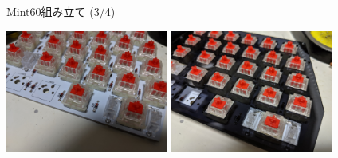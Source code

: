 \documentclass[cjk,dvipdfmx,10pt,compress,fragile%
hyperref={bookmarks=true,bookmarksnumbered=true,bookmarksopen=false,%
colorlinks=false,%
pdftitle={第 134 回 関西 Debian 勉強会},%
pdfauthor={小林},%
pdfsubject={資料},%
}]{beamer}
\begin{document}
\begin{frame}[fragile,t]{Mint60組み立て (3/4)}
 \begin{itemize}
 \end{itemize}
 \vspace*{-1zw}
 \begin{center}
  \includegraphics[keepaspectratio,height=4cm]{./img/mint60-build-03.jpg} \hspace*{1zw}
  \includegraphics[keepaspectratio,height=4cm]{./img/mint60-build-04.jpg}
 \end{center}
 \vspace*{-1zw}
 \begin{itemize}
		    \begin{itemize}
		    \end{itemize}
 \end{itemize}
\end{frame}
\end{document}
